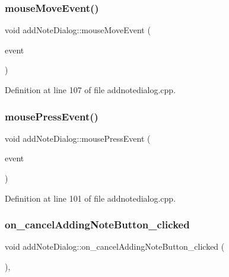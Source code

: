 \subsubsection{\texorpdfstring{mouse\+Move\+Event()}{mouseMoveEvent()}}
{\footnotesize\ttfamily void add\+Note\+Dialog\+::mouse\+Move\+Event (\begin{DoxyParamCaption}\item[{Q\+Mouse\+Event $\ast$}]{event }\end{DoxyParamCaption})\hspace{0.3cm}{\ttfamily [private]}}



Definition at line 107 of file addnotedialog.\+cpp.

\hypertarget{classaddNoteDialog_a5479e71fa86229b5d3a2e03ffd3ddbeb}{}\label{classaddNoteDialog_a5479e71fa86229b5d3a2e03ffd3ddbeb} 
\subsubsection{\texorpdfstring{mouse\+Press\+Event()}{mousePressEvent()}}
{\footnotesize\ttfamily void add\+Note\+Dialog\+::mouse\+Press\+Event (\begin{DoxyParamCaption}\item[{Q\+Mouse\+Event $\ast$}]{event }\end{DoxyParamCaption})\hspace{0.3cm}{\ttfamily [private]}}



Definition at line 101 of file addnotedialog.\+cpp.

\hypertarget{classaddNoteDialog_af0e53e8f605b12087a3982e53409ca2f}{}\label{classaddNoteDialog_af0e53e8f605b12087a3982e53409ca2f} 
\subsubsection{\texorpdfstring{on\+\_\+cancel\+Adding\+Note\+Button\+\_\+clicked}{on\_cancelAddingNoteButton\_clicked}}
{\footnotesize\ttfamily void add\+Note\+Dialog\+::on\+\_\+cancel\+Adding\+Note\+Button\+\_\+clicked (\begin{DoxyParamCaption}{ }\end{DoxyParamCaption})\hspace{0.3cm}{\ttfamily [private]}, {\ttfamily [slot]}}



